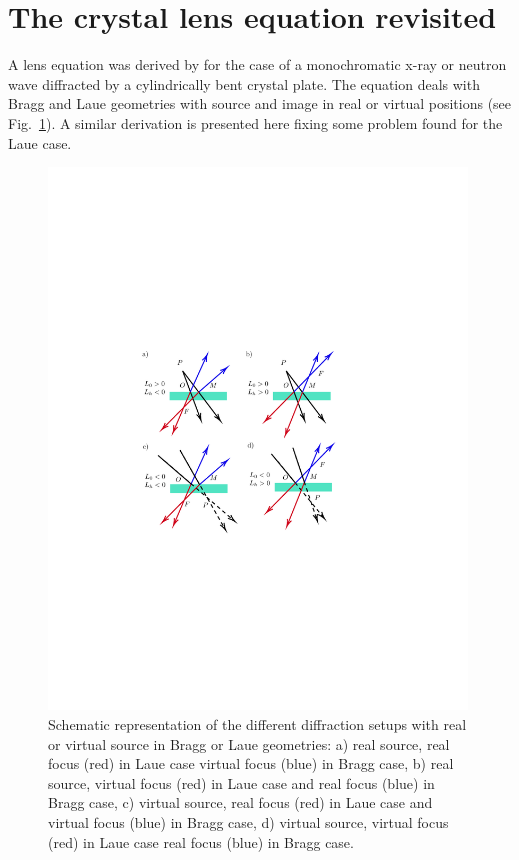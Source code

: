 \documentclass[preprint]{iucr}              %
\begin{document}
\section{The crystal lens equation revisited}
\label{sec:CLE}

A lens equation was derived by \cite{CK} for the case of a monochromatic x-ray or neutron wave diffracted by a cylindrically bent crystal plate. The equation deals with Bragg and Laue geometries with source and image in real or virtual positions (see Fig.~\ref{fig:geometries}). A similar derivation is presented here fixing some problem found for the Laue case.

\begin{figure}
\label{fig:geometries}
\caption{Schematic representation of the different diffraction setups with real or virtual source in Bragg or Laue geometries:
a) real source, real focus (red) in Laue case virtual focus (blue) in Bragg case,
b) real source, virtual focus (red) in Laue case and real focus (blue) in Bragg case,
c) virtual source, real focus (red) in Laue case and virtual focus (blue) in Bragg case,  
d) virtual source, virtual focus (red) in Laue case real focus (blue) in Bragg case.
}
\includegraphics[width=0.99\textwidth,trim=4cm 9cm 6cm 9cm,clip=true]{fig1.pdf}
\end{figure}
\end{document}
